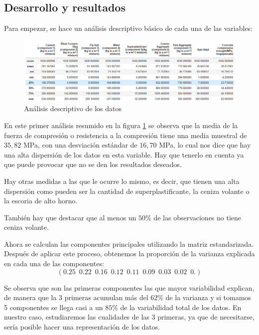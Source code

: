 \subsection*{Desarrollo y resultados}

\noindent Para empezar, se hace un análisis descriptivo básico de cada una de las variables:
\begin{figure}[h]
  \centering
  \includegraphics[scale=0.55]{Documentos Extra/Imagenes/Resumen_Basicos.png}
  \caption{Análisis descriptivo de los datos}
  \label{fig:resumen_basicos}
\end{figure}

\noindent En este primer análisis resumido en la figura \ref{fig:resumen_basicos} se observa que la media de la fuerza de compresión o resistencia a la compresión tiene una media muestral de $35,82$ MPa, con una desviación estándar de $16,70$ MPa, lo cual nos dice que hay una alta dispersión de los datos en esta variable. Hay que tenerlo en cuenta ya que puede provocar que no se den los resultados deseados. 

\noindent Hay otras medidas a las que le ocurre lo mismo, es decir, que tienen una alta dispersión como pueden ser la cantidad de superplastificante, la ceniza volante o la escoria de alto horno. 

\noindent También hay que destacar que al menos un $50\%$ de las observaciones no tiene ceniza volante.  

\noindent Ahora se calculan las componentes principales utilizando la matriz estandarizada. Después de aplicar este proceso, obtenemos la proporción de la varianza explicada en cada una de las componentes:
\begin{equation*}
(0.25 \enspace 0.22 \enspace 0.16 \enspace 0.12 \enspace 0.11 \enspace 0.09 \enspace 0.03 \enspace 0.02 \enspace 0.  )
\end{equation*}

\noindent Se observa que son las primeras componentes las que mayor variabilidad explican, de manera que la 3 primeras acumulan más del $62\%$ de la varianza y si tomamos 5 componentes se llega casi a un $85\%$ de la variabilidad total de los datos. En nuestro caso, estudiaremos las cualidades de las 3 primeras, ya que de necesitarse, sería posible hacer una representación de los datos. 

